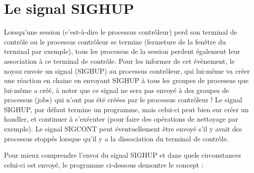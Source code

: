 \section{Le signal SIGHUP}

Lorsqu’une session (c’est-à-dire le processus contrôleur) perd son terminal de contrôle ou le processus contrôleur se termine (fermeture de la fenêtre du terminal par exemple), tous les processus de la session perdent également leur association à ce terminal de contrôle. 
\newline
Pour les informer de cet évènement, le noyau envoie un signal (SIGHUP) au processus contrôleur, qui lui-même va créer une réaction en chaine en envoyant SIGHUP à tous les groupes de processus que lui-même a créé, à noter que ce signal ne sera pas envoyé à des groupes de processus (jobs) qui n’ont pas été créées par le processus contrôleur ! 
\newline
Le signal SIGHUP, par défaut termine un programme, mais celui-ci peut bien sur créer un handler, et continuer à s’exécuter (pour faire des opérations de nettoyage par exemple). Le signal SIGCONT peut éventuellement être envoyé s’il y avait des processus stoppés lorsque qu’il y a la dissociation du terminal de contrôle. 

Pour mieux comprendre l'envoi du signal SIGHUP et dans quels circonstances celui-ci est envoyé, le programme ci-dessous demontre le concept :

